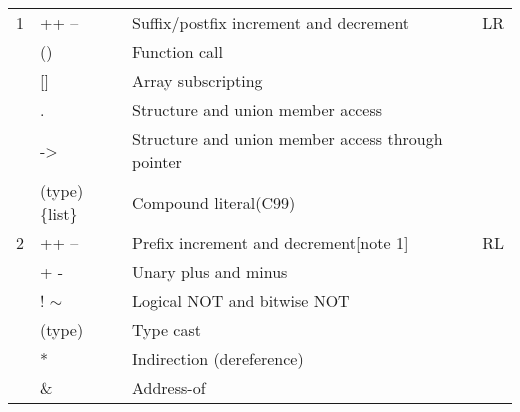 \documentclass{extarticle}
\begin{document}
\begin{tabular}{|l|l|l|l|}
\hline
     &                                               &                                                             &  \\ \hline
1              & ++ --                                                 & Suffix/postfix increment and decrement                                 & LR            \\
               & ()                                                    & Function call                                                          &               \\
               & {[}{]}                                                & Array subscripting                                                     &               \\
               & .                                                     & Structure and union member access                                      &               \\
               & -\textgreater{}                                       & Structure and union member access through pointer                      &               \\
               & (type)\{list\}                                        & Compound literal(C99)                                                  &               \\ \hline
2              & ++ --                                                 & Prefix increment and decrement{[}note 1{]}                             & RL            \\
               & + -                                                   & Unary plus and minus                                                   &               \\
               & ! $\sim$                                              & Logical NOT and bitwise NOT                                            &               \\
               & (type)                                                & Type cast                                                              &               \\
               & *                                                     & Indirection (dereference)                                              &               \\
               & \&                                                    & Address-of                                                             &               \\

\end{tabular}
\end{document}
